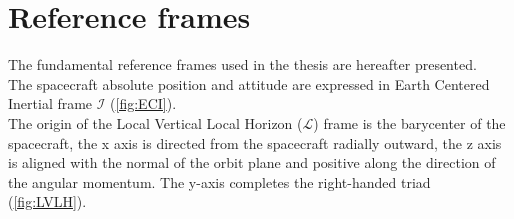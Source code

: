 

\section{Reference frames}
The fundamental reference frames used in the thesis are hereafter presented.\\
The spacecraft absolute position and attitude are expressed in Earth Centered Inertial frame $\mathcal{I}$ (\cref{fig:ECI}). \\
The origin of the Local Vertical Local Horizon ($\mathcal{L}$) frame is the barycenter of the spacecraft, the x axis is directed from the spacecraft radially outward, the z axis is aligned with the normal of the orbit plane and positive along the direction of the angular momentum. The y-axis completes the right-handed triad (\cref{fig:LVLH}).\\

